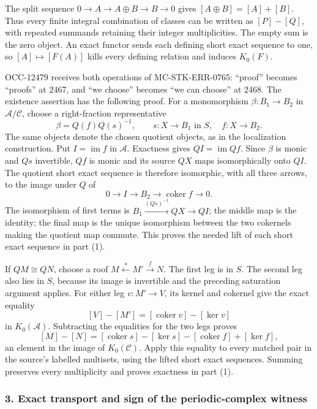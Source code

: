 \documentclass[11pt]{article}
\begin{document}
The split sequence \(0\to A\to A\oplus B\to B\to0\) gives \([A\oplus B]=[A]+[B]\). Thus every finite integral combination of classes can be written as \([P]-[Q]\), with repeated summands retaining their integer multiplicities. The empty sum is the zero object. An exact functor sends each defining short exact sequence to one, so \([A]\mapsto[F(A)]\) kills every defining relation and induces \(K_0(F)\).

OCC-12479 receives both operations of MC-STK-ERR-0765: ``proof'' becomes ``proofs'' at 2467, and ``we choose'' becomes ``we can choose'' at 2468. The existence assertion has the following proof. For a monomorphism \(\beta:B_1\to B_2\) in \(\mathcal A/\mathcal C\), choose a right-fraction representative \[
\beta=Q(f)Q(s)^{-1},\qquad s:X\to B_1\text{ in }S,\quad f:X\to B_2.
\] The same objects denote the chosen quotient objects, as in the localization construction. Put \(I=\operatorname{im}f\) in \(\mathcal A\). Exactness gives \(QI=\operatorname{im}Qf\). Since \(\beta\) is monic and \(Qs\) invertible, \(Qf\) is monic and its source \(QX\) maps isomorphically onto \(QI\). The quotient short exact sequence is therefore isomorphic, with all three arrows, to the image under \(Q\) of \[
0\longrightarrow I\longrightarrow B_2
\longrightarrow\operatorname{coker}f\longrightarrow0.
\] The isomorphism of first terms is \(B_1\xrightarrow{(Qs)^{-1}}QX\to QI\); the middle map is the identity; the final map is the unique isomorphism between the two cokernels making the quotient map commute. This proves the needed lift of each short exact sequence in part (1).

If \(QM\cong QN\), choose a roof \(M\xleftarrow{s}M'\xrightarrow{f}N\). The first leg is in \(S\). The second leg also lies in \(S\), because its image is invertible and the preceding saturation argument applies. For either leg \(v:M'\to V\), its kernel and cokernel give the exact equality \[
[V]-[M']=[\operatorname{coker}v]-[\ker v]
\] in \(K_0(\mathcal A)\). Subtracting the equalities for the two legs proves \[
[M]-[N]
=[\operatorname{coker}s]-[\ker s]
-[\operatorname{coker}f]+[\ker f],
\] an element in the image of \(K_0(\mathcal C)\). Apply this equality to every matched pair in the source's labelled multisets, using the lifted short exact sequences. Summing preserves every multiplicity and proves exactness in part (1).

\subsubsection{3. Exact transport and sign of the periodic-complex witness}\label{exact-transport-and-sign-of-the-periodic-complex-witness}
\end{document}

